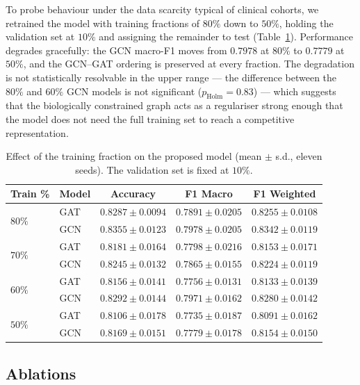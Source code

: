 \documentclass[review,3p,times,11pt, ]{elsarticle} %
\begin{document}
To probe behaviour under the data scarcity typical of clinical cohorts,
we retrained the model with training fractions of $80\%$ down to $50\%$,
holding the validation set at $10\%$ and assigning the remainder to test
(Table~\ref{tab:splits_comparison}). Performance degrades gracefully:
the GCN macro-F1 moves from $0.7978$ at $80\%$ to $0.7779$ at $50\%$,
and the GCN--GAT ordering is preserved at every fraction. The
degradation is not statistically resolvable in the upper range — the
difference between the $80\%$ and $60\%$ GCN models is not significant
($p_{\text{Holm}} = 0.83$) — which suggests that the biologically
constrained graph acts as a regulariser strong enough that the model
does not need the full training set to reach a competitive
representation.

\begin{table}[!t]
\centering
\caption{Effect of the training fraction on the proposed model
(mean $\pm$ s.d., eleven seeds). The validation set is fixed at $10\%$.}
\label{tab:splits_comparison}
\small
\begin{tabular}{llccc}
\toprule
\textbf{Train \%} & \textbf{Model} & \textbf{Accuracy} & \textbf{F1 Macro} & \textbf{F1 Weighted} \\
\midrule
\multirow{2}{*}{$80\%$} & GAT & $0.8287 \pm 0.0094$ & $0.7891 \pm 0.0205$ & $0.8255 \pm 0.0108$ \\
                        & GCN & $0.8355 \pm 0.0123$ & $0.7978 \pm 0.0205$ & $0.8342 \pm 0.0119$ \\
\midrule
\multirow{2}{*}{$70\%$} & GAT & $0.8181 \pm 0.0164$ & $0.7798 \pm 0.0216$ & $0.8153 \pm 0.0171$ \\
                        & GCN & $0.8245 \pm 0.0132$ & $0.7865 \pm 0.0155$ & $0.8224 \pm 0.0119$ \\
\midrule
\multirow{2}{*}{$60\%$} & GAT & $0.8156 \pm 0.0141$ & $0.7756 \pm 0.0131$ & $0.8133 \pm 0.0139$ \\
                        & GCN & $0.8292 \pm 0.0144$ & $0.7971 \pm 0.0162$ & $0.8280 \pm 0.0142$ \\
\midrule
\multirow{2}{*}{$50\%$} & GAT & $0.8106 \pm 0.0178$ & $0.7735 \pm 0.0187$ & $0.8091 \pm 0.0162$ \\
                        & GCN & $0.8169 \pm 0.0151$ & $0.7779 \pm 0.0178$ & $0.8154 \pm 0.0150$ \\
\bottomrule
\end{tabular}
\end{table}

\subsection{Ablations}
\label{ssec:res_ablation}
\end{document}
